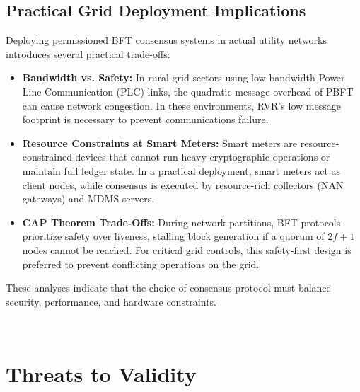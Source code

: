 \documentclass[12pt, oneside, a4paper]{report}
\theoremstyle{definition}
\theoremstyle{remark}
\begin{document}
\section{Practical Grid Deployment Implications}
\label{sec:dis:deployment}

Deploying permissioned BFT consensus systems in actual utility networks introduces several practical trade-offs:
\begin{itemize}
  \item \textbf{Bandwidth vs. Safety:} In rural grid sectors using low-bandwidth Power Line Communication (PLC) links, the quadratic message overhead of PBFT can cause network congestion. In these environments, RVR's low message footprint is necessary to prevent communications failure.
  \item \textbf{Resource Constraints at Smart Meters:} Smart meters are resource-constrained devices that cannot run heavy cryptographic operations or maintain full ledger state. In a practical deployment, smart meters act as client nodes, while consensus is executed by resource-rich collectors (NAN gateways) and MDMS servers.
  \item \textbf{CAP Theorem Trade-Offs:} During network partitions, BFT protocols prioritize safety over liveness, stalling block generation if a quorum of $2f+1$ nodes cannot be reached. For critical grid controls, this safety-first design is preferred to prevent conflicting operations on the grid.
\end{itemize}
These analyses indicate that the choice of consensus protocol must balance security, performance, and hardware constraints.



\cleardoublepage


﻿%
\chapter{Threats to Validity}
\label{ch:threats_to_validity}
\end{document}
